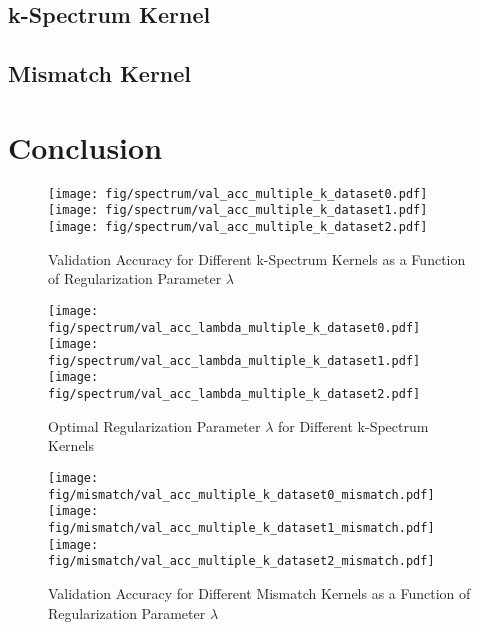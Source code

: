 \documentclass[final]{cvpr}
\begin{document}
	\subsection{k-Spectrum Kernel}
	
	\cite{spectrum}
	
	\subsection{Mismatch Kernel}
	
	\cite{mismatch}

	
	\section{Conclusion}
	
	
	{\small
		
		
	}
	
	\clearpage
	
	\begin{figure}[h!]
	\centering
	\texttt{[image: fig/spectrum/val\_acc\_multiple\_k\_dataset0.pdf]}
	\texttt{[image: fig/spectrum/val\_acc\_multiple\_k\_dataset1.pdf]}
	\texttt{[image: fig/spectrum/val\_acc\_multiple\_k\_dataset2.pdf]}
	\caption{\centering Validation Accuracy for Different k-Spectrum Kernels as a Function of Regularization Parameter $\lambda$}
	\label{fig:acc_spectrum}
	\end{figure}
	
	\newpage
	
	\begin{figure}[h!]
		\centering
		\texttt{[image: fig/spectrum/val\_acc\_lambda\_multiple\_k\_dataset0.pdf]}
		\texttt{[image: fig/spectrum/val\_acc\_lambda\_multiple\_k\_dataset1.pdf]}
		\texttt{[image: fig/spectrum/val\_acc\_lambda\_multiple\_k\_dataset2.pdf]}
		\caption{\centering Optimal Regularization Parameter $\lambda$ for Different k-Spectrum Kernels}
		\label{fig:lambda_spectrum}
	\end{figure}
	
	\begin{figure}[h!]
		\centering
		\texttt{[image: fig/mismatch/val\_acc\_multiple\_k\_dataset0\_mismatch.pdf]}
		\texttt{[image: fig/mismatch/val\_acc\_multiple\_k\_dataset1\_mismatch.pdf]}
		\texttt{[image: fig/mismatch/val\_acc\_multiple\_k\_dataset2\_mismatch.pdf]}
		\caption{\centering Validation Accuracy for Different Mismatch Kernels as a Function of Regularization Parameter $\lambda$}
		\label{fig:acc_mismatch}
	\end{figure}
	
\end{document}
